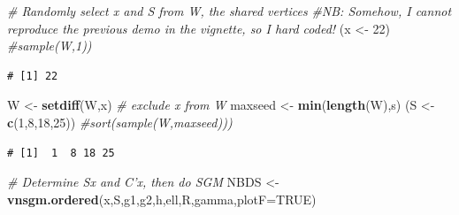 \documentclass[
]{article}
\newenvironment{Shaded}{\begin{snugshade}}{\end{snugshade}}
\newcommand{\CommentTok}[1]{\textcolor[rgb]{0.56,0.35,0.01}{\textit{#1}}}
\newcommand{\DataTypeTok}[1]{\textcolor[rgb]{0.13,0.29,0.53}{#1}}
\newcommand{\DecValTok}[1]{\textcolor[rgb]{0.00,0.00,0.81}{#1}}
\newcommand{\KeywordTok}[1]{\textcolor[rgb]{0.13,0.29,0.53}{\textbf{#1}}}
\newcommand{\NormalTok}[1]{#1}
\newcommand{\OtherTok}[1]{\textcolor[rgb]{0.56,0.35,0.01}{#1}}
\newcommand{\StringTok}[1]{\textcolor[rgb]{0.31,0.60,0.02}{#1}}
\begin{document}
\begin{Shaded}
\begin{Highlighting}[]
\CommentTok{# Randomly select x and S from W, the shared vertices}
\CommentTok{#NB: Somehow, I cannot reproduce the previous demo in the vignette, so I hard coded!}
\NormalTok{(x <-}\StringTok{ }\DecValTok{22}\NormalTok{) }\CommentTok{#sample(W,1))}
\end{Highlighting}
\end{Shaded}

\begin{verbatim}
# [1] 22
\end{verbatim}

\begin{Shaded}
\begin{Highlighting}[]
\NormalTok{W <-}\StringTok{ }\KeywordTok{setdiff}\NormalTok{(W,x) }\CommentTok{# exclude x from W}
\NormalTok{maxseed <-}\StringTok{ }\KeywordTok{min}\NormalTok{(}\KeywordTok{length}\NormalTok{(W),s)}
\NormalTok{(S <-}\StringTok{ }\KeywordTok{c}\NormalTok{(}\DecValTok{1}\NormalTok{,}\DecValTok{8}\NormalTok{,}\DecValTok{18}\NormalTok{,}\DecValTok{25}\NormalTok{)) }\CommentTok{#sort(sample(W,maxseed))) }
\end{Highlighting}
\end{Shaded}

\begin{verbatim}
# [1]  1  8 18 25
\end{verbatim}

\begin{Shaded}
\begin{Highlighting}[]
\CommentTok{# Determine Sx and C'x, then do SGM}
\NormalTok{NBDS <-}\StringTok{ }\KeywordTok{vnsgm.ordered}\NormalTok{(x,S,g1,g2,h,ell,R,gamma,}\DataTypeTok{plotF=}\OtherTok{TRUE}\NormalTok{)}
\end{Highlighting}
\end{Shaded}
\end{document}
